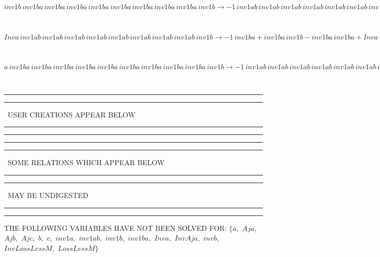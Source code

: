 \begin{minipage}{6in}
$
inv1b\,
 inv1ba\,
 inv1ba\,
 inv1ba\,
 inv1ba\,
 inv1ba\,
 inv1ba\,
 inv1ba\,
 inv1ba\,
 inv1b\rightarrow -1\,
 inv1ab\,
 inv1ab\,
 inv1ab\,
 inv1ab\,
 inv1ab\,
 inv1ab\,
 inv1ab\,
 inv1ab\,
 inv1b + inv1b\,
 inv1ba\,
 inv1ba\,
 inv1ba\,
 inv1ba\,
 inv1ba\,
 inv1ba\,
 inv1ba\,
 inv1ba + inv1b\,
 inv1ab\,
 inv1ab\,
 inv1ab\,
 inv1ab\,
 inv1ab\,
 inv1ab\,
 inv1ab\,
 inv1ab\,
 inv1b
$
\end{minipage}\medskip \\
\begin{minipage}{6in}
$
Inva\,
 inv1ab\,
 inv1ab\,
 inv1ab\,
 inv1ab\,
 inv1ab\,
 inv1ab\,
 inv1ab\,
 inv1ab\,
 inv1b\rightarrow -1\,
 inv1ba + inv1ba\,
 inv1b - inv1ba\,
 inv1ba + Inva\,
 inv1b + inv1ba\,
 inv1ba\,
 inv1b - inv1ba\,
 inv1ba\,
 inv1ba + inv1ba\,
 inv1ba\,
 inv1ba\,
 inv1b - inv1ba\,
 inv1ba\,
 inv1ba\,
 inv1ba + inv1ba\,
 inv1ba\,
 inv1ba\,
 inv1ba\,
 inv1b - inv1ba\,
 inv1ba\,
 inv1ba\,
 inv1ba\,
 inv1ba + inv1ba\,
 inv1ba\,
 inv1ba\,
 inv1ba\,
 inv1ba\,
 inv1b - inv1ba\,
 inv1ba\,
 inv1ba\,
 inv1ba\,
 inv1ba\,
 inv1ba + inv1ba\,
 inv1ba\,
 inv1ba\,
 inv1ba\,
 inv1ba\,
 inv1ba\,
 inv1b - inv1ba\,
 inv1ba\,
 inv1ba\,
 inv1ba\,
 inv1ba\,
 inv1ba\,
 inv1ba + inv1ba\,
 inv1ba\,
 inv1ba\,
 inv1ba\,
 inv1ba\,
 inv1ba\,
 inv1ba\,
 inv1b - inv1ba\,
 inv1ba\,
 inv1ba\,
 inv1ba\,
 inv1ba\,
 inv1ba\,
 inv1ba\,
 inv1ba + inv1ba\,
 inv1ba\,
 inv1ba\,
 inv1ba\,
 inv1ba\,
 inv1ba\,
 inv1ba\,
 inv1ba\,
 inv1b
$
\end{minipage}\medskip \\
\begin{minipage}{6in}
$
a\,
 inv1ba\,
 inv1ba\,
 inv1ba\,
 inv1ba\,
 inv1ba\,
 inv1ba\,
 inv1ba\,
 inv1ba\,
 inv1ba\,
 inv1b\rightarrow -1\,
 inv1ab\,
 inv1ab\,
 inv1ab\,
 inv1ab\,
 inv1ab\,
 inv1ab\,
 inv1ab\,
 inv1ab\,
 inv1b + a\,
 inv1ba\,
 inv1ba\,
 inv1ba\,
 inv1ba\,
 inv1ba\,
 inv1ba\,
 inv1ba\,
 inv1ba\,
 inv1ba + inv1ab\,
 inv1ab\,
 inv1ab\,
 inv1ab\,
 inv1ab\,
 inv1ab\,
 inv1ab\,
 inv1ab\,
 inv1ab\,
 inv1b
$
\end{minipage}\\
\rule[2pt]{6in}{1pt}\hfil\break
\rule[2.5pt]{1.701in}{1pt}
\ USER CREATIONS APPEAR BELOW\ 
\rule[2.5pt]{1.701in}{1pt}\hfil\break
\rule[2pt]{6in}{1pt}\hfil\break
\rule[2pt]{6in}{4pt}\hfil\break
\rule[2pt]{1.45in}{4pt}
\ SOME RELATIONS WHICH APPEAR BELOW\ 
\rule[2pt]{1.45in}{4pt}\hfil\break
\rule[2pt]{2.18in}{4pt}
\ MAY BE UNDIGESTED\ 
\rule[2pt]{2.18in}{4pt}\hfil\break
\rule[2pt]{6in}{4pt}\hfil\break
THE FOLLOWING VARIABLES HAVE NOT BEEN SOLVED FOR:\hfil\break
$\{a,
$ $
Aja,
$ $
Ajb,
$ $
Ajc,
$ $
b,
$ $
c,
$ $
inv1a,
$ $
inv1ab,
$ $
inv1b,
$ $
inv1ba,
$ $
Inva,
$ $
InvAja,
$ $
invb,
$ $
InvLossLessM,
$ $
LossLessM\}$
\smallskip\\
\vspace{10pt}


